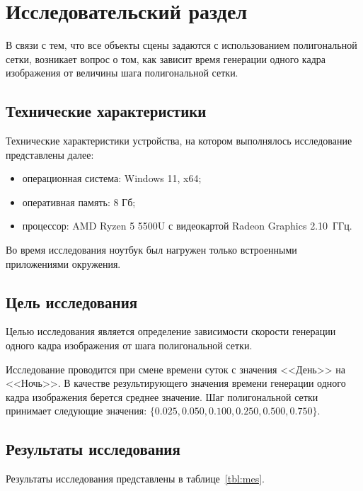 \chapter{Исследовательский раздел}

В связи с тем, что все объекты сцены задаются с использованием полигональной сетки, возникает вопрос о том, как зависит время генерации одного кадра изображения от величины шага полигональной сетки.

\section{Технические характеристики}

Технические характеристики устройства, на котором выполнялось исследование представлены далее:
\begin{itemize}[label={---}]
	\item операционная система: Windows 11, x64;
	\item оперативная память: 8 Гб;
	\item процессор: AMD Ryzen 5 5500U с видеокартой Radeon Graphics 2.10~ГГц.
\end{itemize}

Во время исследования ноутбук был нагружен только встроенными приложениями окружения.

\section{Цель исследования}

Целью исследования является определение зависимости скорости генерации одного кадра изображения от шага полигональной сетки. 

Исследование проводится при смене времени суток с значения <<День>> на <<Ночь>>. В качестве результирующего значения времени генерации одного кадра изображения берется среднее значение. Шаг полигональной сетки принимает следующие значения: $\{0.025, 0.050, 0.100, 0.250, 0.500, 0.750\}$.

\section{Результаты исследования}

Результаты исследования представлены в таблице~\ref{tbl:mes}.

